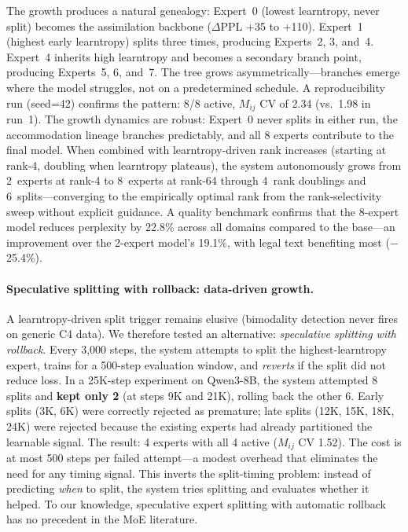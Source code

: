 \documentclass{article}
\begin{document}
The growth produces a natural genealogy: Expert~0 (lowest learntropy,
never split) becomes the assimilation backbone ($\Delta$PPL +35 to +110).
Expert~1 (highest early learntropy) splits three times, producing
Experts~2, 3, and~4. Expert~4 inherits high learntropy and becomes a
secondary branch point, producing Experts~5, 6, and~7. The tree grows
asymmetrically---branches emerge where the model struggles, not on a
predetermined schedule. A reproducibility run (seed=42) confirms the
pattern: 8/8 active, $M_{ij}$ CV of 2.34 (vs.\ 1.98 in run~1). The growth
dynamics are robust: Expert~0 never splits in either run, the
accommodation lineage branches predictably, and all 8 experts contribute
to the final model. When combined with learntropy-driven rank increases
(starting at rank-4, doubling when learntropy plateaus), the system
autonomously grows from 2~experts at rank-4 to 8~experts at rank-64
through 4~rank doublings and 6~splits---converging to the empirically
optimal rank from the rank-selectivity sweep without explicit guidance.
A quality benchmark confirms that the 8-expert model reduces perplexity by
22.8\% across all domains compared to the base---an improvement over the
2-expert model's 19.1\%, with legal text benefiting most ($-$25.4\%).

\paragraph{Speculative splitting with rollback: data-driven growth.}
\label{sec:speculative-split}
A learntropy-driven split trigger remains elusive (bimodality detection
never fires on generic C4 data). We therefore tested an alternative:
\emph{speculative splitting with rollback}. Every 3,000 steps, the system
attempts to split the highest-learntropy expert, trains for a 500-step
evaluation window, and \emph{reverts} if the split did not reduce loss.
In a 25K-step experiment on Qwen3-8B, the system attempted 8 splits and
\textbf{kept only 2} (at steps 9K and 21K), rolling back the other 6.
Early splits (3K, 6K) were correctly rejected as premature; late splits
(12K, 15K, 18K, 24K) were rejected because the existing experts had
already partitioned the learnable signal. The result: 4 experts with all
4 active ($M_{ij}$ CV 1.52). The cost is at most 500 steps per failed
attempt---a modest overhead that eliminates the need for any timing
signal. This inverts the split-timing problem: instead of predicting
\emph{when} to split, the system tries splitting and evaluates whether it
helped. To our knowledge, speculative expert splitting with automatic
rollback has no precedent in the MoE literature.
\end{document}
